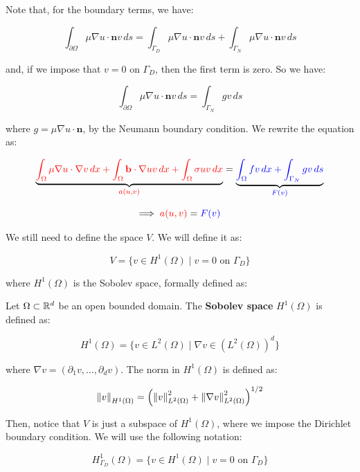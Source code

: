 Note that, for the boundary terms, we have:

$$\int_{\partial \Omega} \mu \nabla u \cdot \mathbf{n} v \, ds = \int_{\Gamma_D} \mu \nabla u \cdot \mathbf{n} v \, ds
+ \int_{\Gamma_N} \mu \nabla u \cdot \mathbf{n} v \, ds$$

and, if we impose that $v = 0$ on $\Gamma_D$, then the first term is zero. So we have:

$$\int_{\partial \Omega} \mu \nabla u \cdot \mathbf{n} v \, ds = \int_{\Gamma_N} g v \, ds$$

where $g = \mu \nabla u \cdot \mathbf{n}$, by the Neumann boundary condition. We rewrite the equation as:

$$
    \underbrace{\color{red}\int_{\Omega} \mu \nabla u \cdot \nabla v \, dx + 
    \int_{\Omega} \mathbf{b} \cdot \nabla u v \, dx + \int_{\Omega} \sigma u v \, dx}_{\color{red}a(u, v)} 
    = \underbrace{\color{blue}\int_{\Omega} f v \, dx + \int_{\Gamma_N} g v \, ds}_{\color{blue}F(v)}
$$

\begin{equation}
    \Longrightarrow \; {\color{red}a(u, v)} = {\color{blue}F(v)}
\end{equation}

We still need to define the space $V$. We will define it as:

$$V = \{ v \in H^1(\Omega) \; | \; v = 0 \text{ on } \Gamma_D \}$$

where $H^1(\Omega)$ is the Sobolev space, formally defined as:

\begin{fdefinition}
    Let $\Omega \subset \mathbb{R}^d$ be an open bounded domain. The \textbf{Sobolev space} $H^1(\Omega)$ is defined as:

    $$H^1(\Omega) = \{ v \in L^2(\Omega) \; | \; \nabla v \in (L^2(\Omega))^d \}$$

    where $\nabla v = (\partial_1 v, \ldots, \partial_d v)$. The norm in $H^1(\Omega)$ is defined as:

    $$\left\|v\right\|_{H^1(\Omega)} = \left( \left\|v\right\|_{L^2(\Omega)}^2 + \left\|\nabla v\right\|_{L^2(\Omega)}^2 \right)^{1/2}$$

\end{fdefinition}

Then, notice that $V$ is just a subspace of $H^1(\Omega)$, where we impose the Dirichlet boundary condition.
We will use the following notation:

\begin{equation}
    H_{\Gamma_D}^1(\Omega) = \{ v \in H^1(\Omega) \; | \; v = 0 \text{ on } \Gamma_D \}
\end{equation}

